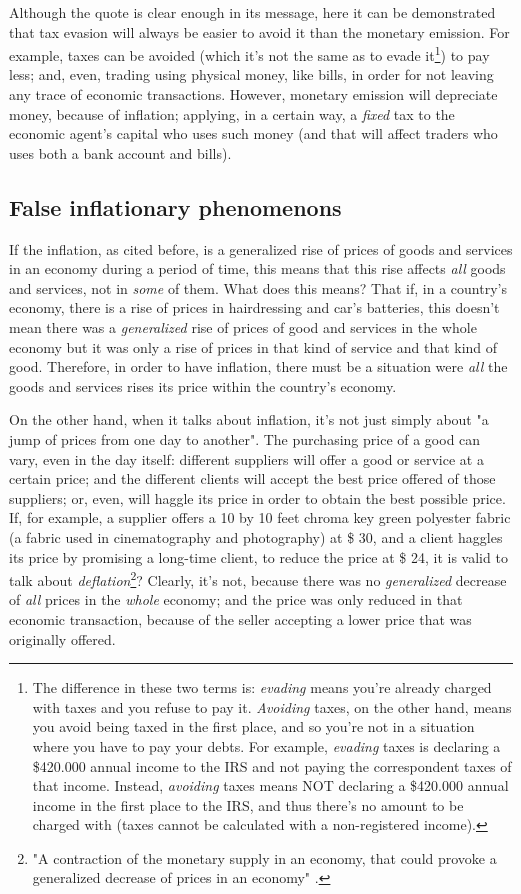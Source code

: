 \documentclass[12pt,a4paper,twoside]{book}
\begin{document}
Although the quote is clear enough in its message, here it can be demonstrated that tax evasion will always be easier to avoid it than the monetary emission. For example, taxes can be avoided (which it's not the same as to evade it\footnote{The difference in these two terms is: \textit{evading} means you're already charged with taxes and you refuse to pay it. \textit{Avoiding} taxes, on the other hand, means you avoid being taxed in the first place, and so you're not in a situation where you have to pay your debts. For example, \textit{evading} taxes is declaring a \$420.000 annual income to the IRS and not paying the correspondent taxes of that income. Instead, \textit{avoiding} taxes means NOT declaring a \$420.000 annual income in the first place to the IRS, and thus there's no amount to be charged with (taxes cannot be calculated with a non-registered income).}) to pay less; and, even, trading using physical money, like bills, in order for not leaving any trace of economic transactions. However, monetary emission will depreciate money, because of inflation; applying, in a certain way, a \textit{fixed} tax to the economic agent's capital who uses such money (and that will affect traders who uses both a bank account and bills).

\subsection{False inflationary phenomenons}
If the inflation, as cited before, is a generalized rise of prices of goods and services in an economy during a period of time, this means that this rise affects \textit{all} goods and services, not in \textit{some} of them. What does this means? That if, in a country's economy, there is a rise of prices in hairdressing and car's batteries, this doesn't mean there was a \textit{generalized} rise of prices of good and services in the whole economy but it was only a rise of prices in that kind of service and that kind of good. Therefore, in order to have inflation, there must be a situation were \textit{all} the goods and services rises its price within the country's economy.

On the other hand, when it talks about inflation, it's not just simply about "a jump of prices from one day to another". The purchasing price of a good can vary, even in the day itself: different suppliers will offer a good or service at a certain price; and the different clients will accept the best price offered of those suppliers; or, even, will haggle its price in order to obtain the best possible price. If, for example, a supplier offers a 10 by 10 feet chroma key green polyester fabric (a fabric used in cinematography and photography) at \$ 30, and a client haggles its price by promising a long-time client, to reduce the price at \$ 24, it is valid to talk about \textit{deflation}\footnote{"A contraction of the monetary supply in an economy, that could provoke a generalized decrease of prices in an economy" \cite{epedia:deflac}.}? Clearly, it's not, because there was no \textit{generalized} decrease of \textit{all} prices in the \textit{whole} economy; and the price was only reduced in that economic transaction, because of the seller accepting a lower price that was originally offered.
\end{document}
